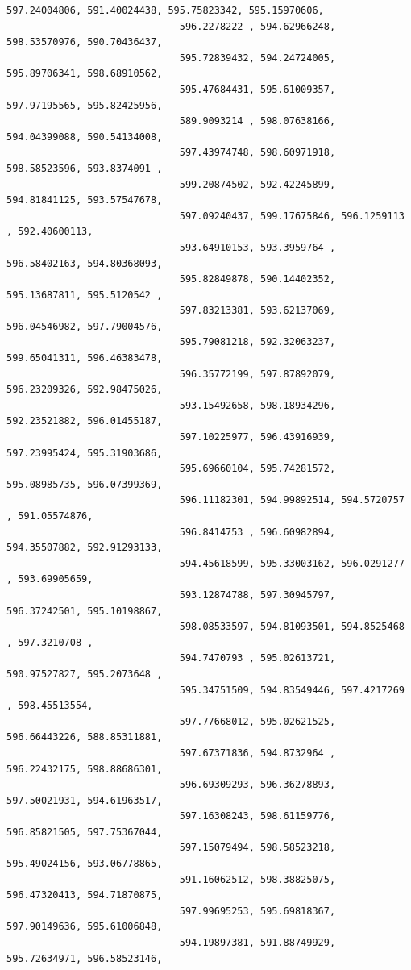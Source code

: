 \documentclass[11pt]{article}
\begin{document}
\begin{Verbatim}[commandchars=\\\{\}]
                              597.24004806, 591.40024438, 595.75823342, 595.15970606,
                              596.2278222 , 594.62966248, 598.53570976, 590.70436437,
                              595.72839432, 594.24724005, 595.89706341, 598.68910562,
                              595.47684431, 595.61009357, 597.97195565, 595.82425956,
                              589.9093214 , 598.07638166, 594.04399088, 590.54134008,
                              597.43974748, 598.60971918, 598.58523596, 593.8374091 ,
                              599.20874502, 592.42245899, 594.81841125, 593.57547678,
                              597.09240437, 599.17675846, 596.1259113 , 592.40600113,
                              593.64910153, 593.3959764 , 596.58402163, 594.80368093,
                              595.82849878, 590.14402352, 595.13687811, 595.5120542 ,
                              597.83213381, 593.62137069, 596.04546982, 597.79004576,
                              595.79081218, 592.32063237, 599.65041311, 596.46383478,
                              596.35772199, 597.87892079, 596.23209326, 592.98475026,
                              593.15492658, 598.18934296, 592.23521882, 596.01455187,
                              597.10225977, 596.43916939, 597.23995424, 595.31903686,
                              595.69660104, 595.74281572, 595.08985735, 596.07399369,
                              596.11182301, 594.99892514, 594.5720757 , 591.05574876,
                              596.8414753 , 596.60982894, 594.35507882, 592.91293133,
                              594.45618599, 595.33003162, 596.0291277 , 593.69905659,
                              593.12874788, 597.30945797, 596.37242501, 595.10198867,
                              598.08533597, 594.81093501, 594.8525468 , 597.3210708 ,
                              594.7470793 , 595.02613721, 590.97527827, 595.2073648 ,
                              595.34751509, 594.83549446, 597.4217269 , 598.45513554,
                              597.77668012, 595.02621525, 596.66443226, 588.85311881,
                              597.67371836, 594.8732964 , 596.22432175, 598.88686301,
                              596.69309293, 596.36278893, 597.50021931, 594.61963517,
                              597.16308243, 598.61159776, 596.85821505, 597.75367044,
                              597.15079494, 598.58523218, 595.49024156, 593.06778865,
                              591.16062512, 598.38825075, 596.47320413, 594.71870875,
                              597.99695253, 595.69818367, 597.90149636, 595.61006848,
                              594.19897381, 591.88749929, 595.72634971, 596.58523146,

\end{Verbatim}
\end{document}
